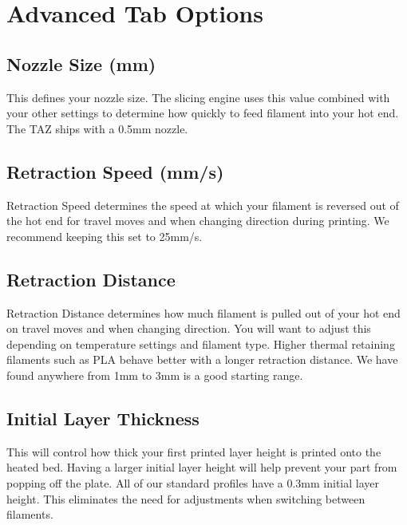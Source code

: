 \section{Advanced Tab Options}

\subsection{Nozzle Size (mm)}
This defines your nozzle size. The slicing engine uses this value combined with your other settings to determine how quickly to feed filament into your hot end. The TAZ ships with a 0.5mm nozzle. 


\subsection{Retraction Speed (mm/s)}
Retraction Speed determines the speed at which your filament is reversed out of the hot end for travel moves and when changing direction during printing. We recommend keeping this set to 25mm/s.

\subsection{Retraction Distance}
Retraction Distance determines how much filament is pulled out of your hot end on travel moves and when changing direction. You will want to adjust this depending on temperature settings and filament type. Higher thermal retaining filaments such as PLA behave better with a longer retraction distance. We have found anywhere from 1mm to 3mm is a good starting range.

\subsection{Initial Layer Thickness}
This will control how thick your first printed layer height is printed onto the heated bed. Having a larger initial layer height will help prevent your part from popping off the plate. All of our standard profiles have a 0.3mm initial layer height. This eliminates the need for adjustments when switching between filaments.  %
